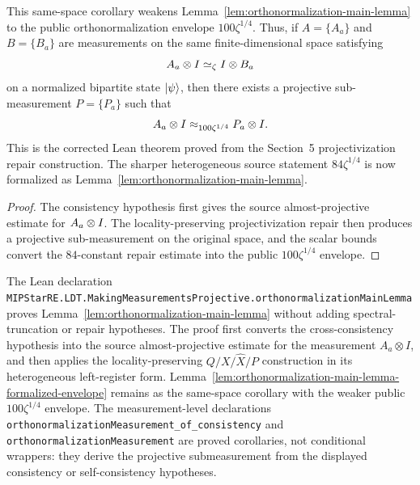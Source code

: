 \begin{lemma}\label{lem:orthonormalization-main-lemma-formalized-envelope}
	\leanok
	This same-space corollary weakens Lemma~\ref{lem:orthonormalization-main-lemma}
	to the public orthonormalization envelope \(100\zeta^{1/4}\).  Thus, if \(A=\{A_a\}\) and
	\(B=\{B_a\}\) are measurements on the same finite-dimensional space satisfying
	\[
		A_a \otimes I \simeq_\zeta I \otimes B_a
	\]
	on a normalized bipartite state \(\lvert \psi \rangle\), then there exists a projective
	sub-measurement \(P=\{P_a\}\) such that
	\[
		A_a \otimes I \approx_{100\zeta^{1/4}} P_a \otimes I .
	\]
	This is the corrected Lean theorem proved from the Section~5
	projectivization repair construction.  The sharper heterogeneous source
	statement \(84\zeta^{1/4}\) is now formalized as
	Lemma~\ref{lem:orthonormalization-main-lemma}.
\end{lemma}
\begin{proof}
	\leanok
	The consistency hypothesis first gives the source almost-projective estimate
	for \(A_a\otimes I\).  The locality-preserving projectivization repair then
	produces a projective sub-measurement on the original space, and the scalar
	bounds convert the \(84\)-constant repair estimate into the public
	\(100\zeta^{1/4}\) envelope.
\end{proof}

\begin{remark}
	\label{rem:lean-orthonormalization-main-declarations}
	The Lean declaration
	\texttt{MIPStarRE.LDT.MakingMeasurementsProjective.orthonormalizationMainLemma}
	proves Lemma~\ref{lem:orthonormalization-main-lemma} without adding
	spectral-truncation or repair hypotheses.  The proof first converts the
	cross-consistency hypothesis into the source almost-projective estimate for
	the measurement \(A_a \otimes I\), and then applies the locality-preserving
	\(Q/X/\widehat X/P\) construction in its heterogeneous left-register form.
	Lemma~\ref{lem:orthonormalization-main-lemma-formalized-envelope} remains as
	the same-space corollary with the weaker public \(100\zeta^{1/4}\) envelope.
	The measurement-level declarations
	\texttt{orthonormalizationMeasurement\_of\_consistency} and
	\texttt{orthonormalizationMeasurement} are proved corollaries, not
	conditional wrappers: they derive the projective submeasurement from the
	displayed consistency or self-consistency hypotheses.
\end{remark}

